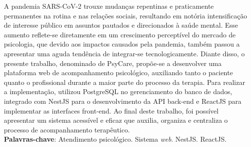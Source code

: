 \begin{resumo}[RESUMO]
\begin{SingleSpacing}

A pandemia SARS-CoV-2 trouxe mudanças repentinas e praticamente permanentes na rotina e nas relações sociais, resultando em notória intensificação de interesse público em assuntos pautados e direcionados à saúde mental. Esse aumento reflete-se diretamente em um crescimento perceptível do mercado de psicologia, que devido aos impactos causados pela pandemia, também passou a apresentar uma aguda tendência de integrar-se tecnologicamente. Diante disso, o presente trabalho, denominado de PsyCare, propõe-se a desenvolver uma plataforma web de acompanhamento psicológico, auxiliando tanto o paciente quanto o profissional durante a maior parte do processo da terapia. Para realizar a implementação, utilizou PostgreSQL no gerenciamento do banco de dados, integrado com NestJS para o desenvolvimento da API back-end e ReactJS para implementar as interfaces front-end. Ao final deste trabalho, foi possível apresentar um sistema acessível e eficaz que auxilia, organiza e centraliza o processo de acompanhamento terapêutico. \\

\textbf{Palavras-chave}: Atendimento psicológico. Sistema \textit{web}. NestJS. ReactJS.

\end{SingleSpacing}
\end{resumo}

